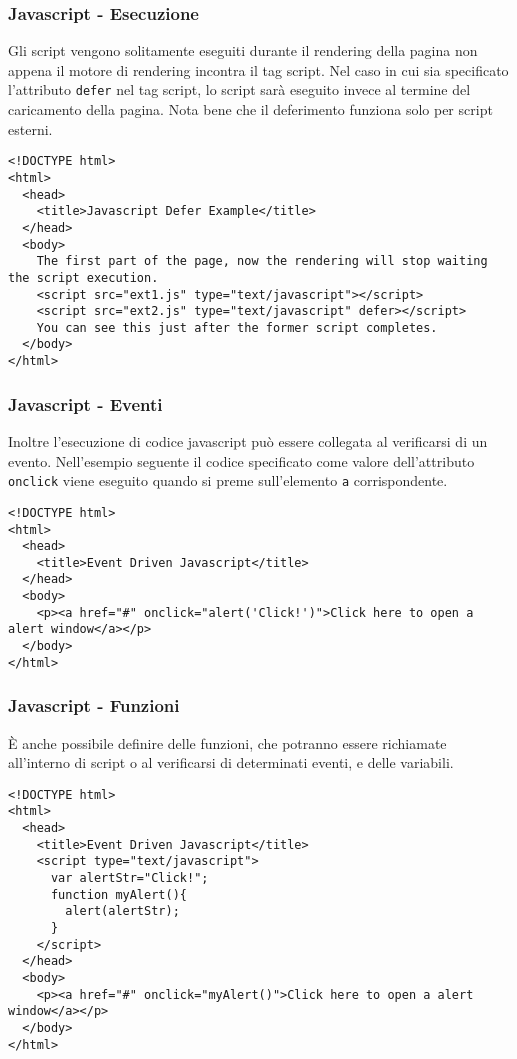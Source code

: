 \documentclass[8pt]{beamer}
\begin{document}
\begin{frame}[fragile]
 \frametitle{Javascript - Esecuzione}
 Gli script vengono solitamente eseguiti durante il rendering della pagina 
 non appena il motore di rendering incontra il tag script. Nel caso
 in cui sia specificato l'attributo \texttt{defer} nel tag script,
 lo script sar\`a eseguito invece al termine del caricamento della pagina.
 Nota bene che il deferimento funziona solo per script esterni.
 \begin{small}
 \begin{verbatim}
<!DOCTYPE html>
<html>
  <head>
    <title>Javascript Defer Example</title>
  </head>
  <body>
    The first part of the page, now the rendering will stop waiting the script execution.
    <script src="ext1.js" type="text/javascript"></script>
    <script src="ext2.js" type="text/javascript" defer></script>
    You can see this just after the former script completes. 
  </body>
</html> 
 \end{verbatim}
 \end{small} 
\end{frame}

\begin{frame}[fragile]
 \frametitle{Javascript - Eventi}
 Inoltre l'esecuzione di codice javascript pu\`o essere collegata al verificarsi 
 di un evento. Nell'esempio seguente il codice specificato come valore dell'attributo 
 \texttt{onclick} viene eseguito quando si preme sull'elemento \texttt{a} corrispondente.
 
 \begin{small}
 \begin{verbatim}
<!DOCTYPE html>
<html>
  <head>
    <title>Event Driven Javascript</title>
  </head>
  <body>
    <p><a href="#" onclick="alert('Click!')">Click here to open a alert window</a></p>
  </body>
</html> 
 \end{verbatim}
 \end{small}
\end{frame}

\begin{frame}[fragile]
 \frametitle{Javascript - Funzioni}
 \`E anche possibile definire delle funzioni, che potranno essere richiamate
 all'interno di script o al verificarsi di determinati eventi, e delle variabili.
 
 \begin{small}
 \begin{verbatim}
<!DOCTYPE html>
<html>
  <head>
    <title>Event Driven Javascript</title>
    <script type="text/javascript">
      var alertStr="Click!";
      function myAlert(){
        alert(alertStr);
      }
    </script>
  </head>
  <body>
    <p><a href="#" onclick="myAlert()">Click here to open a alert window</a></p>
  </body>
</html> 
 \end{verbatim}
 \end{small}
\end{frame}
\end{document}
